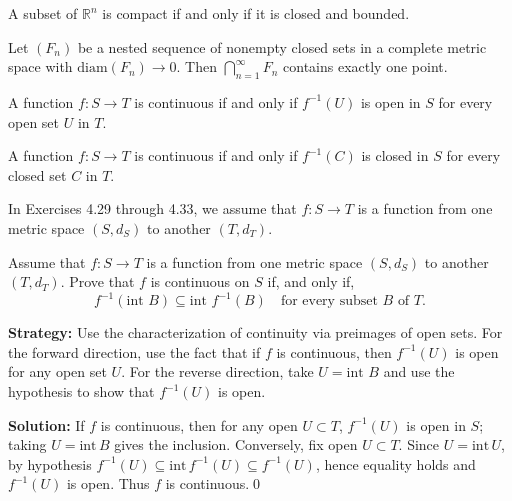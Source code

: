 \begin{theorem}
A subset of $\mathbb{R}^n$ is compact if and only if it is closed and bounded.
\end{theorem}

\begin{theorem}
Let $(F_n)$ be a nested sequence of nonempty closed sets in a complete metric space with $\text{diam}(F_n) \to 0$. Then $\bigcap_{n=1}^{\infty} F_n$ contains exactly one point.
\end{theorem}

\begin{theorem}
A function $f: S \to T$ is continuous if and only if $f^{-1}(U)$ is open in $S$ for every open set $U$ in $T$.
\end{theorem}

\begin{theorem}
A function $f: S \to T$ is continuous if and only if $f^{-1}(C)$ is closed in $S$ for every closed set $C$ in $T$.
\end{theorem}

In Exercises 4.29 through 4.33, we assume that $f:S\to T$ is a function from one metric space $(S,d_S)$ to another $(T,d_T)$.



\begin{problembox}
Assume that $f : S \rightarrow T$ is a function from one metric space $(S, d_S)$ to another $(T, d_T)$. Prove that $f$ is continuous on $S$ if, and only if,
\[ f^{-1}(\text{int } B) \subseteq \text{int } f^{-1}(B) \quad \text{for every subset } B \text{ of } T. \]
\end{problembox}

\noindent\textbf{Strategy:} Use the characterization of continuity via preimages of open sets. For the forward direction, use the fact that if $f$ is continuous, then $f^{-1}(U)$ is open for any open set $U$. For the reverse direction, take $U = \text{int } B$ and use the hypothesis to show that $f^{-1}(U)$ is open.

\bigskip\noindent\textbf{Solution:}
If $f$ is continuous, then for any open $U\subset T$, $f^{-1}(U)$ is open in $S$; taking $U=\mathrm{int}\,B$ gives the inclusion. Conversely, fix open $U\subset T$. Since $U=\mathrm{int}\,U$, by hypothesis $f^{-1}(U)\subseteq\mathrm{int}\,f^{-1}(U)\subseteq f^{-1}(U)$, hence equality holds and $f^{-1}(U)$ is open. Thus $f$ is continuous.\qed



